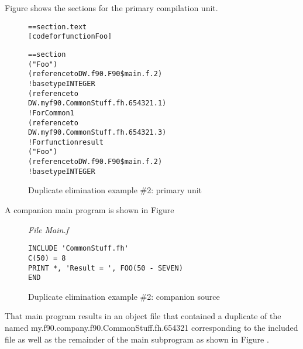 Figure 
shows the sections for the primary compilation unit.

\begin{figure}
\begin{dwflisting}
\begin{alltt}
== section .text
    [code for function Foo]

== section 
            ("Foo")
            (reference to DW.f90.F90\$main.f.2)
                ! base type INTEGER
                (reference to
                    DW.myf90.CommonStuff.fh.654321.1)
             ! For Common1
                (reference to
                    DW.myf90.CommonStuff.fh.654321.3)
             ! For function result
                ("Foo")
                    (reference to DW.f90.F90\$main.f.2)
                        ! base type INTEGER
\end{alltt}
\end{dwflisting}
\caption{Duplicate elimination example \#2: primary unit}
\label{fig:duplicateeliminationexample2primaryunit}
\end{figure}

A companion main program is shown in 
Figure 

\begin{figure}
\textit{File Main.f} 
\begin{lstlisting}[numbers=none]
INCLUDE 'CommonStuff.fh'
C(50) = 8
PRINT *, 'Result = ', FOO(50 - SEVEN)
END
\end{lstlisting}
\caption{Duplicate elimination example \#2: companion source }
\label{fig:duplicateeliminationexample2companionsource}
\end{figure}

That main program results in an object file that
contained a duplicate of the  named
my.f90.company.f90.CommonStuff.fh.654321 
corresponding to the
included file as well as the remainder of the main subprogram
as shown in 
Figure .

